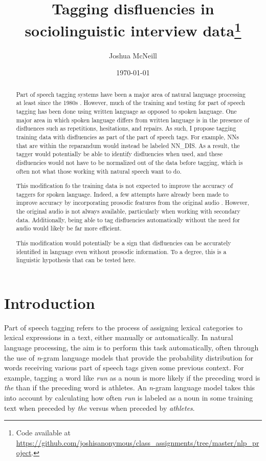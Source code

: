 \documentclass{article}
\title{Tagging disfluencies in sociolinguistic interview data\footnote{Code available at \url{https://github.com/joshisanonymous/class_assignments/tree/master/nlp_project}.}}
\author{Joshua McNeill}
\date{\today}
\newcommand{\lexi}[1]{\textit{#1}}
\begin{document}
  \maketitle
  \begin{abstract}
    Part of speech tagging systems have been a major area of natural language processing at least since the 1980s \parencite[e.g.,][]{garside_claws_1987}.
    However, much of the training and testing for part of speech tagging has been done using written language as opposed to spoken language.
    One major area in which spoken language differs from written language is in the presence of disfluences such as repetitions, hesitations, and repairs.
    As such, I propose tagging training data with disfluencies as part of the part of speech tags.
    For example, NNs that are within the reparandum would instead be labeled NN\_DIS.
    As a result, the tagger would potentially be able to identify disfluencies when used, and these disfluencies would not have to be normalized out of the data before tagging, which is often not what those working with natural speech want to do.

    This modification fo the training data is not expected to improve the accuracy of taggers for spoken language.
    Indeed, a few attempts have already been made to improve accuracy by incorporating prosodic features from the original audio \parencite[e.g.,][]{christodoulides_dismo:_2018}.
    However, the original audio is not always available, particularly when working with secondary data.
    Additionally, being able to tag disfluencies automatically without the need for audio would likely be far more efficient.

    This modification would potentially be a sign that disfluencies can be accurately identified in language even without prosodic information.
    To a degree, this is a linguistic hypothesis that can be tested here.
  \end{abstract}

  \section{Introduction}
    Part of speech tagging refers to the process of assigning lexical categories to lexical expressions in a text, either manually or automatically.
    In natural language processing, the aim is to perform this task automatically, often through the use of \emph{n}-gram language models that provide the probability distribution for words receiving various part of speech tags given some previous context.
    For example, tagging a word like \lexi{run} as a noun is more likely if the preceding word is \lexi{the} than if the preceding word is {athletes}.
    An \emph{n}-gram language model takes this into account by calculating how often \lexi{run} is labeled as a noun in some training text when preceded by \lexi{the} versus when preceded by \lexi{athletes}.
\end{document}

